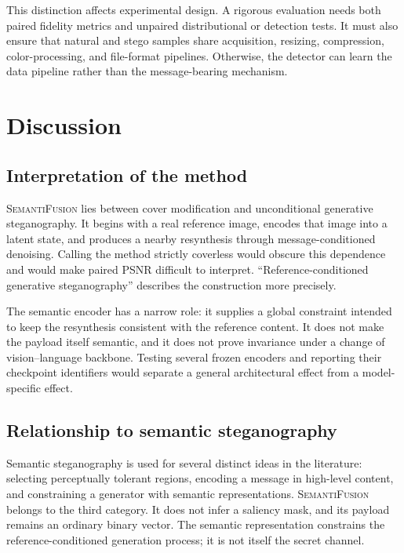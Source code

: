 \documentclass[pdflatex,sn-mathphys-num]{sn-jnl}
\newcommand{\method}{\textsc{SemantiFusion}}
\begin{document}
This distinction affects experimental design. A rigorous evaluation needs both paired fidelity metrics and unpaired distributional or detection tests. It must also ensure that natural and stego samples share acquisition, resizing, compression, color-processing, and file-format pipelines. Otherwise, the detector can learn the data pipeline rather than the message-bearing mechanism.

\section{Discussion}
\label{sec:discussion}

\subsection{Interpretation of the method}

\method{} lies between cover modification and unconditional generative steganography. It begins with a real reference image, encodes that image into a latent state, and produces a nearby resynthesis through message-conditioned denoising. Calling the method strictly coverless would obscure this dependence and would make paired PSNR difficult to interpret. ``Reference-conditioned generative steganography'' describes the construction more precisely.

The semantic encoder has a narrow role: it supplies a global constraint intended to keep the resynthesis consistent with the reference content. It does not make the payload itself semantic, and it does not prove invariance under a change of vision--language backbone. Testing several frozen encoders and reporting their checkpoint identifiers would separate a general architectural effect from a model-specific effect.

\subsection{Relationship to semantic steganography}

Semantic steganography is used for several distinct ideas in the literature: selecting perceptually tolerant regions, encoding a message in high-level content, and constraining a generator with semantic representations. \method{} belongs to the third category. It does not infer a saliency mask, and its payload remains an ordinary binary vector. The semantic representation constrains the reference-conditioned generation process; it is not itself the secret channel.
\end{document}
